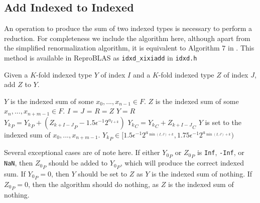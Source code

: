 \subsection{Add Indexed to Indexed}
    \label{sec:primitiveops_addindexedtoindexed}
    An operation to produce the sum of two indexed types is necessary to
    perform a reduction. For completeness we include the algorithm here,
    although apart from the simplified renormalization algorithm, it is
    equivalent to Algorithm $7$ in \cite{repsum}.
    This method is available in ReproBLAS as \texttt{idxd\_xixiadd} in \texttt{idxd.h}

    \begin{samepage}
    \begin{alg}
      Given a $K$-fold indexed type $Y$ of index $I$ and a $K$-fold indexed
      type $Z$ of index $J$, add $Z$ to $Y$.
      \begin{algorithmic}[1]
        \Require
          \Statex $Y$ is the indexed sum of some $x_0, ..., x_{n - 1} \in F$.
          \Statex $Z$ is the indexed sum of some $x_n, ..., x_{n + m - 1} \in F$.
          \State $I$ = 
          \State $J$ = 
            \State $R = Z$
            \State {}
            \State $Y = R$
            \State \Return
          \EndIf
           \label{alg:addindexedtoindexed:beginfor}
            \State ${Y_{k}}_P = {Y_{k}}_P + ({Z_{k + I-J}}_P - 1.5 \epsilon^{-1}  2^{a_{I+k}})$\label{alg:addindexedtoindexed:pri}
            \State ${Y_{k}}_C = {Y_{k}}_C + {Z_{k + I - J}}_C$\label{alg:addindexedtoindexed:car}
          \EndFor
          \State {}\label{alg:addindexedtoindexed:renorm}
        \EndFunction
        \Ensure
          \Statex $Y$ is set to the indexed sum of $x_0, ..., x_{n + m - 1}$.
          \Statex ${Y_k}_P \in [1.5  \epsilon^{-1} 2^{a_{\min(I, J) + k}}, 1.75  \epsilon^{-1} 2^{a_{\min(I, J) + k}})$
      \end{algorithmic}
      \label{alg:addindexedtoindexed}
    \end{alg}
    \end{samepage}
    Several exceptional cases are of note here. If either ${Y_0}_P$ or ${Z_0}_P$ is \texttt{Inf}, \texttt{-Inf}, or \texttt{NaN}, then ${Z_0}_P$ should be added to ${Y_0}_P$, which will produce the correct indexed sum. If ${Y_0}_P = 0$, then $Y$ should be set to $Z$ as $Y$ is the indexed sum of nothing. If ${Z_0}_P = 0$, then the algorithm should do nothing, as $Z$ is the indexed sum of nothing.

